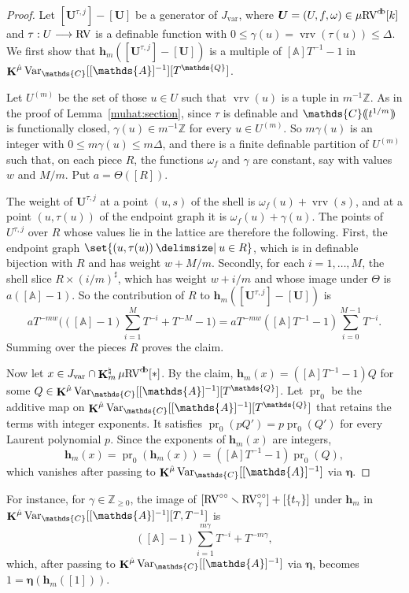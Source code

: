 \documentclass[12pt]{amsart}
\theoremstyle{plain}
\theoremstyle{definition}
\theoremstyle{remark}
\numberwithin{equation}{section}
\theoremstyle{plain}
\newcommand{\RV}{\textup{RV}}
\newcommand{\Z}{\mathds{Z}}
\newcommand{\A}{\mathds{A}}
\newcommand{\C}{\mathds{C}}
\newcommand{\Q}{\mathds{Q}}
\newcommand{\0}{\emptyset}
\newcommand{\dpar}[1]{%
   (\mkern-4mu (#1 )\mkern-4mu )}
\newcommand{\fun}{\longrightarrow}
\newcommand{\mi}{\smallsetminus}
\providecommand\given{}
\newcommand\SetSymbol[1][]{%
\nonscript \: #1 \vert
\allowbreak
\nonscript\:
\mathopen{}}
\renewcommand\given{\SetSymbol[\delimsize]}
\newcommand{\mgRV}{{\mu}{\RV}}
\DeclareMathOperator{\ggk}{\mathbf{K}}
\DeclareMathOperator{\vrv}{vrv}
\DeclareMathOperator{\db}{d \! b}
\newcommand{\var}{\textup{Var}}
\newcommand{\gmv}{\ggk^{\hat \mu}\var_{\C}}
\begin{document}
\begin{proof}
Let $[\bm U^{\tau, j}] - [\bm U]$ be a generator of $J_{\mathrm{var}}$, where $\bm U = (U, f, \omega) \in \mgRV^{\db}[k]$ and $\tau : U \fun \RV$ is a definable function with $0 \leq \gamma(u) = \vrv(\tau(u)) \leq \Delta$. We first show that $\bm h_m([\bm U^{\tau, j}] - [\bm U])$ is a multiple of $[\A] T^{-1} - 1$ in $\gmv[[\A]^{-1}][T^{\Q}]$.

Let $U^{(m)}$ be the set of those $u \in U$ such that $\vrv(u)$ is a tuple in $m^{-1}\Z$. As in the proof of Lemma~\ref{muhat:section}, since $\tau$ is definable and $\C \dpar{ t^{1/m} }$ is functionally closed, $\gamma(u) \in m^{-1}\Z$ for every $u \in U^{(m)}$. So $m \gamma(u)$ is an integer with $0 \leq m\gamma(u) \leq m \Delta$, and there is a finite definable partition of $U^{(m)}$ such that, on each piece $R$, the functions $\omega_f$ and $\gamma$ are constant, say with values $w$ and $M/m$. Put $a = \Theta([R])$.

The weight of $\bm U^{\tau, j}$ at a point $(u, s)$ of the shell is $\omega_f(u) + \vrv(s)$, and at a point $(u, \tau(u))$ of the endpoint graph it is $\omega_f(u) + \gamma(u)$. The points of $U^{\tau, j}$ over $R$ whose values lie in the lattice are therefore the following. First, the endpoint graph $\set{(u, \tau(u)) \given u \in R}$, which is in definable bijection with $R$ and has weight $w + M/m$. Secondly, for each $i = 1, \ldots, M$, the shell slice $R \times (i/m)^\sharp$, which has weight $w + i/m$ and whose image under $\Theta$ is $a([\A] - 1)$. So the contribution of $R$ to $\bm h_m([\bm U^{\tau, j}] - [\bm U])$ is
\[
a T^{-mw} \Big( ([\A] - 1) \sum_{i = 1}^{M} T^{-i} + T^{-M} - 1 \Big) = a T^{-mw} ([\A] T^{-1} - 1) \sum_{i = 0}^{M-1} T^{-i}.
\]
Summing over the pieces $R$ proves the claim.

Now let $x \in J_{\mathrm{var}} \cap \ggk^\natural_m \mgRV^{\db}[*]$. By the claim, $\bm h_m(x) = ([\A] T^{-1} - 1) Q$ for some $Q \in \gmv[[\A]^{-1}][T^{\Q}]$. Let $\operatorname{pr}_0$ be the additive map on $\gmv[[\A]^{-1}][T^{\Q}]$ that retains the terms with integer exponents. It satisfies $\operatorname{pr}_0(p Q') = p \operatorname{pr}_0(Q')$ for every Laurent polynomial $p$. Since the exponents of $\bm h_m(x)$ are integers,
\[
\bm h_m(x) = \operatorname{pr}_0(\bm h_m(x)) = ([\A] T^{-1} - 1) \operatorname{pr}_0(Q),
\]
which vanishes after passing to $\gmv[[\A]^{-1}]$ via $\bm \eta$.
\end{proof}

For instance, for $\gamma \in \Z_{\geq 0}$, the image of $[\RV^{\circ \circ} \mi \RV^{\circ \circ}_{\gamma}] + [\{t_\gamma\}]$ under $\bm h_m$ in $\gmv[[\A]^{-1}][T, T^{-1}]$ is
\[
 ([\A] - 1) \sum_{i = 1}^{m\gamma} T^{-i} + T^{-m\gamma},
\]
which, after passing to $\gmv[[\A]^{-1}]$ via $\bm \eta$, becomes $1 = \bm \eta (\bm h_m([1]))$.
\end{document}
